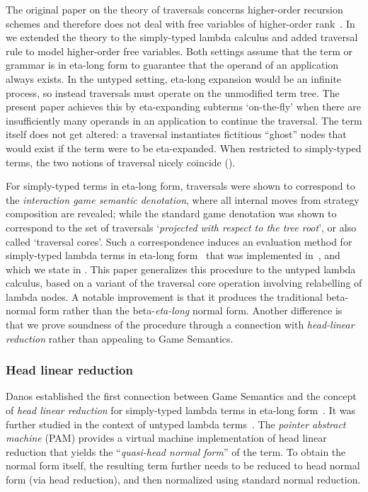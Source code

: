 \documentclass[xchauthor,chkrefs,GCNS,amsmath,amsthm,rotating,leaveRGB]{tcsg}
\theoremstyle{plain}
\theoremstyle{definition}
\begin{document}
The original paper on the theory of traversals concerns higher-order
recursion schemes and therefore does not deal with free variables of
higher-order rank~\cite{OngLics2006}. In~\cite{BlumPhd} we extended the
theory to the simply-typed lambda calculus and added traversal rule to model
higher-order free variables. Both settings assume that the term or grammar is
in eta-long form to guarantee that the operand of an application always
exists. In the untyped setting, eta-long expansion would be an infinite
process, so instead traversals must operate on the unmodified term tree. The
present paper achieves this by eta-expanding subterms `on-the-fly' when there
are insufficiently many operands in an application to continue the traversal.
The term itself does not get altered: a traversal instantiates fictitious
``ghost'' nodes that would exist if the term were to be eta-expanded. When
restricted to simply-typed terms, the two notions of traversal nicely
coincide ().

For simply-typed terms in eta-long form, traversals were shown to correspond
to the \emph{interaction game semantic denotation}, where all internal moves
from strategy composition are revealed; while the standard game denotation
was shown to correspond to the set of traversals `\emph{projected with
respect to the tree root}', or also called `traversal cores'. Such a
correspondence induces an evaluation method for simply-typed lambda terms in
eta-long form~\cite{BlumPhd,BlumGalop2008,Ong-NormByTrav2015} that was
implemented in~\cite{Blum-HogTool}, and which we state in
. This paper
generalizes this procedure to the untyped lambda calculus, based on a variant
of the traversal core operation involving relabelling of lambda nodes. A
notable improvement is that it produces the traditional beta-normal form
rather than the beta-\emph{eta-long} normal form. Another difference is that
we prove soundness of the procedure through a connection with
\emph{head-linear reduction} rather than appealing to Game Semantics.

\subsubsection{Head linear reduction}\label{sec1.3.2}

Danos  established the first connection between
Game Semantics and the concept of \emph{head linear reduction} for
simply-typed lambda terms in eta-long form~\cite{danosherbelinregnier1996}.
It was further studied in the context of untyped lambda
terms~\cite{danos-head}. The \emph{pointer abstract machine} (PAM) provides a
virtual machine implementation of head linear reduction that yields the
``\emph{quasi-head normal form}'' of the term. To obtain the normal form
itself, the resulting term further needs to be reduced to head normal form
(via head reduction), and then normalized using standard normal reduction.
\end{document}
